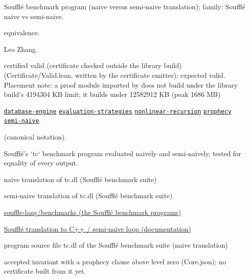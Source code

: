 \documentclass[10pt]{article}
\begin{document}
\begin{description}[leftmargin=2.6cm,style=nextline,itemsep=1pt]

\item[Category] Soufflé benchmark program (naive versus semi-naive translation); family: Soufflé naive vs semi-naive.

\item[Kind] equivalence.

\item[Contributors] Leo Zhang.

\item[Status] certified valid (certificate checked outside the library build) (Certificate/Valid.lean, written by the certificate emitter); expected valid. Placement note: a proof module imported by  does not build under the library build's 4194304 KB limit; it builds under 12582912 KB (peak 1686 MB)

\item[Tags] \hyperref[tag:database-engine]{\texttt{database-engine}} \hyperref[tag:evaluation-strategies]{\texttt{evaluation-strategies}} \hyperref[tag:nonlinear-recursion]{\texttt{nonlinear-recursion}} \hyperref[tag:prophecy]{\texttt{prophecy}} \hyperref[tag:semi-naive]{\texttt{semi-naive}}.

\item[Input]  (canonical notation).

\item[Summary] Soufflé's `tc` benchmark program evaluated naively and semi-naively, tested for equality of every output.

\item[Sides] naive translation of tc.dl (Soufflé benchmark suite) \par semi-naive translation of tc.dl (Soufflé benchmark suite)

\item[Sources] {\raggedright \href{https://github.com/souffle-lang/benchmarks}{souffle-lang/benchmarks (the Soufflé benchmark programs)} \par \href{https://souffle-lang.github.io/translate}{Soufflé translation to C++ / semi-naive loop (documentation)} \par program source file tc.dl of the Soufflé benchmark suite (naive translation)\par}

\item[Prophecy] accepted invariant with a prophecy clause above level zero (Core.json); no certificate built from it yet.

\end{description}
\end{document}

